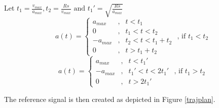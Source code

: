   Let $t_1 = \frac{v_{max}}{a_{max}}, t_2 = \frac{Rs}{v_{max}}  \text{ and } t_1' = \sqrt{\frac{Rs}{a_{max}}}$\\
  \begin{equation}
  a(t) = \left\{ \begin{array}{lcl} a_{max} & , & t < t_1 \\
				      0 & , & t_1 < t < t_2 \\ 
				  -a_{max} &,& t_2 < t < t_1 + t_2 \\
				  0 & , & t>t_1 + t_2
		  \end{array} \right.\text{ , if } t_1 < t_2
  \end{equation}
  \begin{equation}
  a(t) = \left\{ \begin{array}{lcl} a_{max} & , & t < t_1' \\
				  -a_{max} &,& t_1' < t < 2t_1'\\
				  0 & , & t>2t_1'
		  \end{array} \right.\text{ , if } t_1 > t_2
  \end{equation}


The reference signal is then created as depicted in Figure \ref{trajplan}.

